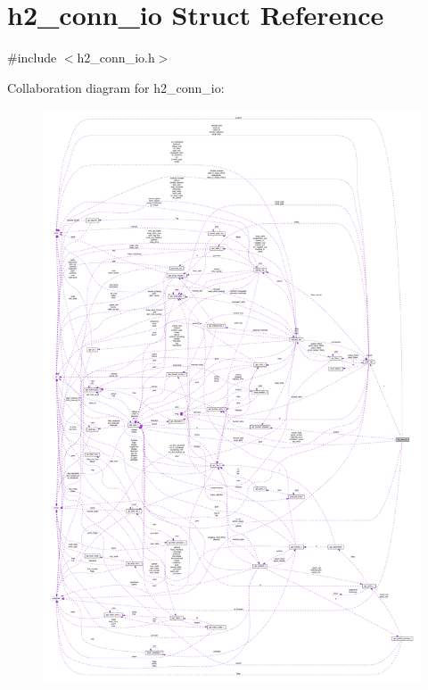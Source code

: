 \hypertarget{structh2__conn__io}{}\section{h2\+\_\+conn\+\_\+io Struct Reference}
\label{structh2__conn__io}


{\ttfamily \#include $<$h2\+\_\+conn\+\_\+io.\+h$>$}



Collaboration diagram for h2\+\_\+conn\+\_\+io\+:
\nopagebreak
\begin{figure}[H]
\begin{center}
\leavevmode
\includegraphics[width=350pt]{structh2__conn__io__coll__graph}
\end{center}
\end{figure}
